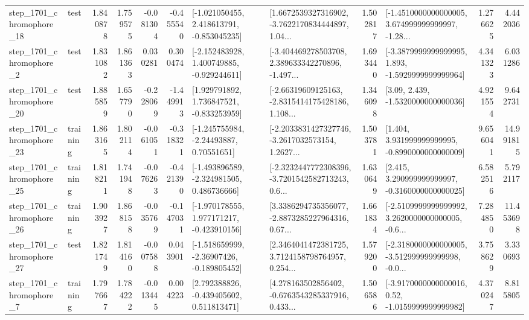 \begin{tabular}{llrrrrllrlrr}
 step\_1701\_chromophore\_18 &      test &      1.840878 &    1.759575 &     -0.081304 & -0.455540 &   [-1.021050455, 2.418613791, -0.853045235] &  [1.6672539327316902, -3.7622170834444897, 1.04... &       1.502817 &  [-1.4510000000000005, 3.674999999999997, -1.28... &            1.276625 &          4.442036 \\
  step\_1701\_chromophore\_2 &      test &      1.831082 &    1.861363 &      0.030281 &  0.300474 &   [-2.152483928, 1.400749885, -0.929244611] &  [-3.404469278503708, 2.389633342270896, -1.497... &       1.693440 &  [-3.3879999999999995, 1.893, -1.5929999999999964] &            4.341323 &          6.031286 \\
 step\_1701\_chromophore\_20 &      test &      1.885859 &    1.657790 &     -0.228069 & -1.449913 &    [1.929791892, 1.736847521, -0.833253959] &  [-2.66319609125163, -2.8315414175428186, 1.108... &       1.346098 &                 [3.09, 2.439, -1.5320000000000036] &            4.921554 &          9.642731 \\
 step\_1701\_chromophore\_23 &  training &      1.863165 &    1.802114 &     -0.061051 & -0.318321 &     [-1.245755984, -2.24493887, 0.70551651] &  [-2.2033831427327746, -3.2617032573154, 1.2627... &       1.503781 &    [1.404, 3.931999999999995, -0.8990000000000009] &            9.656041 &         14.991815 \\
 step\_1701\_chromophore\_25 &  training &      1.818211 &    1.741948 &     -0.076263 & -0.421390 &   [-1.493896589, -2.324981505, 0.486736666] &  [-2.3232447772308396, -3.7201542582713243, 0.6... &       1.630649 &    [2.415, 3.290999999999997, -0.3160000000000025] &            6.582516 &          5.792117 \\
 step\_1701\_chromophore\_26 &  training &      1.903927 &    1.868158 &     -0.035769 & -0.147031 &   [-1.970178555, 1.977171217, -0.423910156] &  [3.3386294735356077, -2.8873285227964316, 0.67... &       1.661834 &  [-2.5109999999999992, 3.2620000000000005, -0.6... &            7.284850 &         11.453698 \\
 step\_1701\_chromophore\_27 &      test &      1.821749 &    1.814160 &     -0.007588 &  0.043901 &   [-1.518659999, -2.36907426, -0.189805452] &  [2.3464041472381725, 3.7124158798764957, 0.254... &       1.579200 &  [-2.3180000000000005, -3.512999999999998, -0.0... &            3.758629 &          3.330693 \\
  step\_1701\_chromophore\_7 &  training &      1.797667 &    1.784222 &     -0.013445 &  0.004223 &    [2.792388826, -0.439405602, 0.511813471] &  [4.278163502856402, -0.6763543285337916, 0.433... &       1.506586 &   [-3.9170000000000016, 0.52, -1.0159999999999982] &            4.370247 &          8.815805 \\

\end{tabular}
